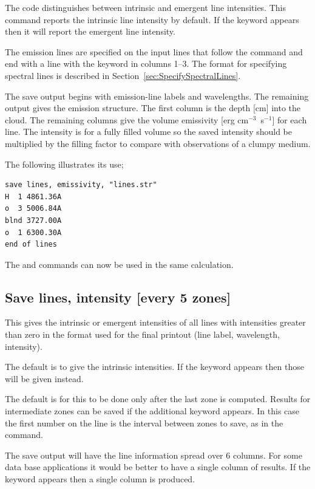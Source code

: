 The code distinguishes between intrinsic and emergent
line intensities.
This command reports the intrinsic line intensity by default.
If the keyword  appears then it will
report the emergent line intensity.

The emission lines are specified on the input lines that follow the
command and end with a line with the keyword  in columns 1--3.
The format for specifying spectral lines is described in Section~\ref{sec:SpecifySpectralLines}.

The save output begins with emission-line labels and wavelengths.  The
remaining output gives the emission structure.  The first column is the
depth [cm] into the cloud.  The remaining columns give the volume emissivity
[erg cm$^{-3}$~s$^{-1}$] for each line.  The intensity is for a fully filled volume
so the saved intensity should be multiplied by the filling factor to
compare with observations of a clumpy medium.

The following illustrates its use;
\begin{verbatim}
save lines, emissivity, "lines.str"
H  1 4861.36A
o  3 5006.84A
blnd 3727.00A
o  1 6300.30A
end of lines
\end{verbatim}

The  and  commands can now be used in the same calculation.

\subsection{Save lines, intensity [every 5 zones]}

This gives the
intrinsic or emergent intensities of all lines with
intensities greater than zero in the format used for the final printout
(line label, wavelength, intensity).

The default is to give the intrinsic intensities.
If the keyword  appears then
those will be given instead.

The default is for this to be done
only after the last zone is computed.  Results for intermediate zones can
be saved if the additional keyword  appears.
In this case the first
number on the line is the interval between zones to save,
as in the  command.

The save output will have the line information spread over 6 columns.
For some data base applications it would be better to have a single column
of results.  If the keyword  appears then a single column is produced.

